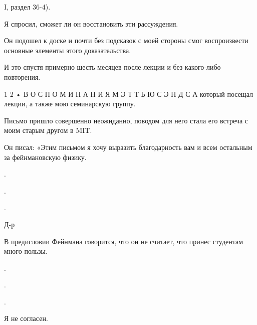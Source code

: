 \documentclass[11pt,oneside]{article}
\begin{document}
I, раздел 36-4).\par



Я спросил, сможет ли он восстановить эти рассуждения.\par



Он подошел к доске и почти без подсказок с моей стороны смог воспроизвести основные элементы этого доказательства.\par



И это спустя примерно шесть месяцев после лекции и без какого-либо повторения.\par



1 2 • В О С П О М И Н А Н И Я  М Э Т Т Ь Ю  С Э Н Д С А который посещал лекции, а также мою семинарскую группу.\par



Письмо пришло совершенно неожиданно, поводом для него стала его встреча с моим старым другом в MIT.\par



Он писал: «Этим письмом я хочу выразить благодарность вам и всем остальным за фейнмановскую физику.\par



.\par



.\par



.\par



Д-р\par



В предисловии Фейнмана говорится, что он не считает, что принес студентам много пользы.\par



.\par



.\par



.\par



Я не согласен.\par
\end{document}
